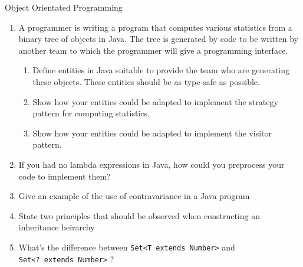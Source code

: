 \documentclass{tripos}
\begin{document}
\begin{question}[MockIA,year=2025,paper=1,question=3,author=rrw]{Object Orientated Programming}

  \begin{enumerate}
  \item
    A programmer is writing a program that computes various statistics
    from a binary tree of objects in Java. The tree is generated by code
    to be written by another team to which the programmer will give a
    programming interface.

  \begin{enumerate}
  \item Define entities in Java suitable to provide the team who are generating these objects. These entities should be as type-safe as possible. 
  \item Show how your entities could be adapted to implement the strategy pattern for computing statistics. 
  \item Show how your entities could be adapted to implement the visitor pattern. 
  \end{enumerate}
  
\item
  If you had no lambda expressions in Java, how could you preprocess your code to implement them? 

\item Give an example of the use of contravariance in a Java program 
\item State two principles that should be observed when constructing an inheritance heirarchy 
\item What's the difference between \verb|Set<T extends Number>| and \\
  \verb|Set<? extends Number>| ? 
\end{enumerate}
\eject
\end{question}
\end{document}
